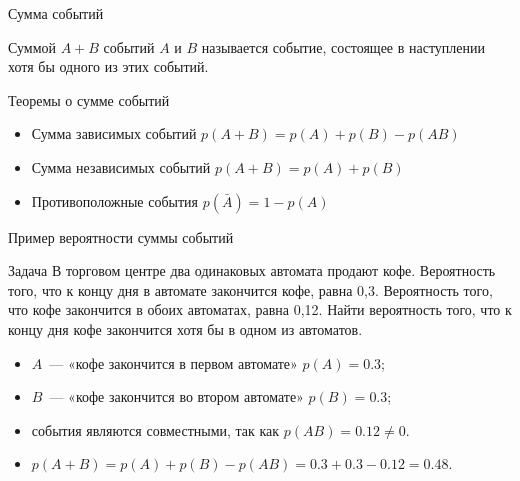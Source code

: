 \documentclass[unicode,11pt,notheorems,xcolor=table]{beamer}
\begin{document}
\begin{frame}{Сумма событий}{}
  
    
    \alert{Суммой $A+B$} событий $A$ и $B$ называется событие, состоящее в наступлении хотя бы одного из этих событий.
    
    {\centering 
    \par}    
    \begin{block}{Теоремы о сумме событий}
        \begin{itemize}
            \item Сумма зависимых событий \alert{$p(A+B)=p(A)+p(B)-p(AB)$}
            \item Сумма независимых событий \alert{$p(A+B)=p(A)+p(B)$}
            \item Противоположные события \alert{$p(\bar{A})=1-p(A)$}
        \end{itemize}
    \end{block}
\end{frame}

    \begin{frame}{Пример вероятности суммы событий}{}
        \begin{exampleblock}{Задача}
            В торговом центре два одинаковых автомата продают кофе. 
            Вероятность того, что к концу дня  в автомате закончится кофе, равна 0,3. 
            Вероятность того, что кофе закончится в обоих автоматах, равна 0,12. 
            Найти вероятность того, что к концу дня кофе закончится хотя бы в одном из автоматов.
        \end{exampleblock}
        \begin{itemize}
            \item $A$~--- «кофе закончится в первом автомате» \hfill \alert{$p(A)=0.3$};
            \item $B$~--- «кофе закончится во втором автомате» \hfill \alert{$p(B)=0.3$};
            \item события являются совместными, так как \hfill \alert{$p(AB)=0.12 \neq 0$}.
            \item \alert{$p(A+B)= p(A)+p(B)-p(AB) = 0.3+0.3-0.12 = 0.48$}.
        \end{itemize}
    \end{frame}
\end{document}
